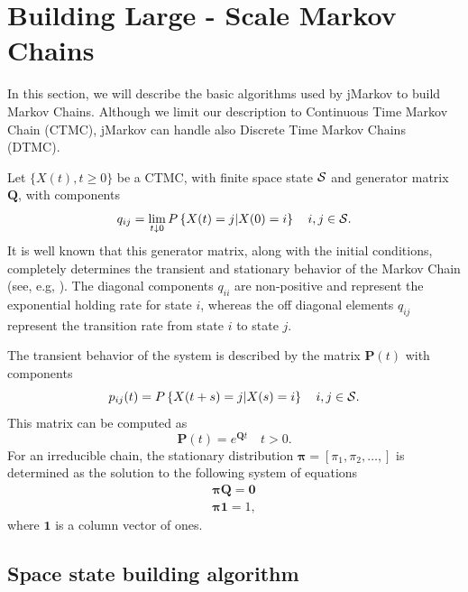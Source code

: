 \documentclass[11pt,letterpaper]{article}
\newcommand{\bP}{{\mathbf P}}
\newcommand{\bQ}{{\mathbf Q}}
\newcommand{\one}{{\mathbf 1}}
\newcommand{\zero}{{\mathbf 0}}
\newcommand{\bpi}{{\boldsymbol{\pi}}}
\newcommand{\cS}{{\cal S}}
\renewcommand{\Pr}[1]{P\left\{#1\right\}}
\begin{document}
\section{Building Large - Scale Markov Chains} \label{sec:BuildRS}

In this section, we will describe the basic algorithms used by jMarkov to build
Markov Chains.  Although we limit our description to Continuous Time Markov
Chain (CTMC), jMarkov can handle also Discrete Time Markov Chains
(DT\-MC).

Let $\{ X(t),  t \geq 0 \}$ be a CTMC, with finite space state
$\cS$ and generator matrix $\bQ$, with components
\[ q_{ij} = \lim_{t\downarrow 0} \Pr{X(t)=j | X(0)=i} \quad i,j\in\cS.\]
It is well known that this generator matrix, along with the initial conditions,
completely determines the transient and stationary behavior of the Markov Chain
(see, e.g, \cite{kulk95}).  The diagonal components $q_{ii}$ are non-positive
and represent the exponential holding rate for state $i$, whereas the off
diagonal elements $q_{ij}$ represent the transition rate from state $i$ to state
$j$.

The transient behavior of the system is described by the matrix $\bP(t)$ with
components
\[ p_{ij}(t) =\Pr{X(t+s)=j|X(s)=i} \quad i,j\in\cS. \]
This matrix can be computed as
\[ \bP(t) = e^{\bQ t} \quad t>0.\] %
For an irreducible chain, the stationary distribution
$\bpi=[\pi_1,\pi_2,\ldots,]$ is determined as the solution to the following
system of equations
\begin{gather*}
\bpi \bQ = \zero\\
\bpi\one = 1,
\end{gather*}
where $\one$ is a column vector of ones.

\subsection{Space state building algorithm}
\label{sec:SpaceStateBuildingAlgorithm}
\end{document}
